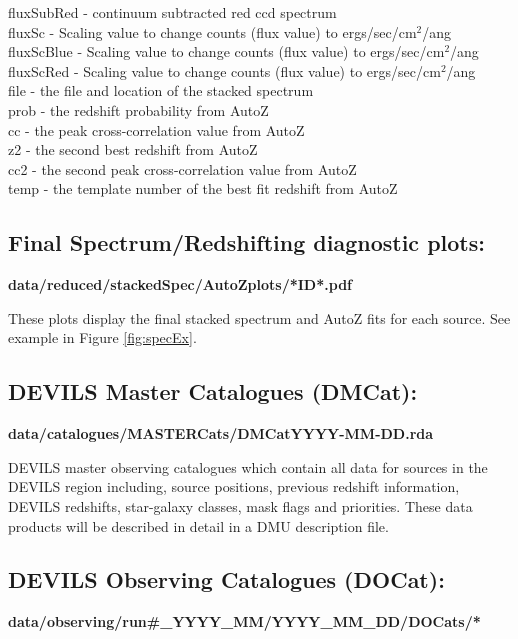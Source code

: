 \documentclass[12pt]{article}
\begin{document}
fluxSubRed - continuum subtracted red ccd spectrum \\
fluxSc - Scaling value to change counts (flux value) to ergs/sec/cm$^2$/ang\\
fluxScBlue - Scaling value to change counts (flux value) to ergs/sec/cm$^2$/ang\\
fluxScRed  - Scaling value to change counts (flux value) to ergs/sec/cm$^2$/ang\\
file - the file and location of the stacked spectrum\\
prob - the redshift probability from AutoZ\\
cc - the peak cross-correlation value from AutoZ\\
z2 - the second best redshift from AutoZ\\
cc2 - the second peak cross-correlation value from AutoZ\\
temp - the template number of the best fit redshift from AutoZ \\


  \subsection{Final Spectrum/Redshifting diagnostic plots:}
  
  \textbf{data/reduced/stackedSpec/AutoZplots/*ID*.pdf} 
  
  These plots display the final stacked spectrum and AutoZ fits for each source. See example in Figure \ref{fig:specEx}.
 
 \subsection{DEVILS Master Catalogues (DMCat):}
 
\textbf{data/catalogues/MASTERCats/DMCatYYYY-MM-DD.rda} 
   
DEVILS master observing catalogues which contain all data for sources in the DEVILS region including, source positions, previous redshift information, DEVILS redshifts, star-galaxy classes, mask flags and priorities. These data products will be described in detail in a DMU description file.
 
  
 

 \subsection{DEVILS Observing Catalogues (DOCat):}
 
 \textbf{data/observing/run\#\_YYYY\_MM/YYYY\_MM\_DD/DOCats/*} 
   
\end{document}
